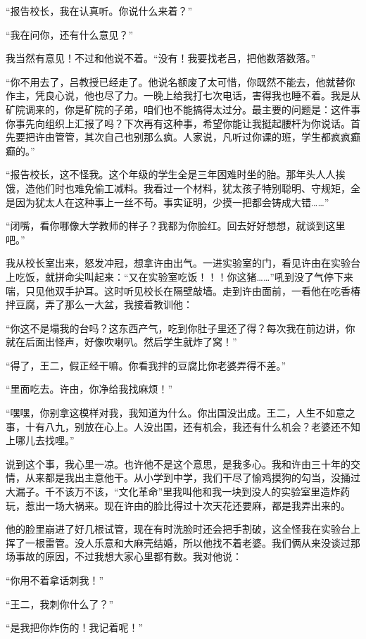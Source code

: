  “报告校长，我在认真听。你说什么来着？” 
 
 “我在问你，还有什么意见？” 
 
 我当然有意见！不过和他说不着。“没有！我要找老吕，把他数落数落。”
 
 “你不用去了，吕教授已经走了。他说名额废了太可惜，你既然不能去，他就替你作主，凭良心说，他也尽了力。一晚上给我打七次电话，害得我也睡不着。我是从矿院调来的，你是矿院的子弟，咱们也不能搞得太过分。最主要的问题是：这件事你事先向组织上汇报了吗？下次再有这种事，希望你能让我挺起腰杆为你说话。首先要把许由管管，其次自己也别那么疯。人家说，凡听过你课的班，学生都疯疯癫癫的。” 
 
 “报告校长，这不怪我。这个年级的学生全是三年困难时坐的胎。那年头人人挨饿，造他们时也难免偷工减料。我看过一个材料，犹太孩子特别聪明、守规矩，全是因为犹太人在这种事上一丝不苟。事实证明，少摸一把都会铸成大错……” 
 
 “闭嘴，看你哪像大学教师的样子？我都为你脸红。回去好好想想，就谈到这里吧。” 
 
 我从校长室出来，怒发冲冠，想拿许由出气。一进实验室的门，看见许由在实验台上吃饭，就拼命尖叫起来：“又在实验室吃饭！！！你这猪……”吼到没了气停下来喘，只见他双手护耳。这时听见校长在隔壁敲墙。走到许由面前，一看他在吃香椿拌豆腐，弄了那么一大盆，我接着教训他： 
 
 “你这不是塌我的台吗？这东西产气，吃到你肚子里还了得？每次我在前边讲，你就在后面出怪声，好像吹喇叭。然后学生就炸了窝！” 
 
 “得了，王二，假正经干嘛。你看我拌的豆腐比你老婆弄得不差。” 
 
 “里面吃去。许由，你净给我找麻烦！” 
 
 “嘿嘿，你别拿这模样对我，我知道为什么。你出国没出成。王二，人生不如意之事，十有八九，别放在心上。人没出国，还有机会，我还有什么机会？老婆还不知上哪儿去找哩。” 
 
 说到这个事，我心里一凉。也许他不是这个意思，是我多心。我和许由三十年的交情，从来都是我出主意他干。从小学到中学，我们干尽了愉鸡摸狗的勾当，没捅过大漏子。千不该万不该，“文化革命”里我叫他和我一块到没人的实验室里造炸药玩，惹出一场大祸来。现在许由的脸比得过十次天花还要麻，都是我弄出来的。 
 
 他的脸里崩进了好几根试管，现在有时洗脸时还会把手割破，这全怪我在实验台上挥了一根雷管。没人乐意和大麻壳结婚，所以他找不着老婆。我们俩从来没谈过那场事故的原因，不过我想大家心里都有数。我对他说： 
 
 “你用不着拿话刺我！” 
 
 “王二，我刺你什么了？” 
 
 “是我把你炸伤的！我记着呢！” 
 

